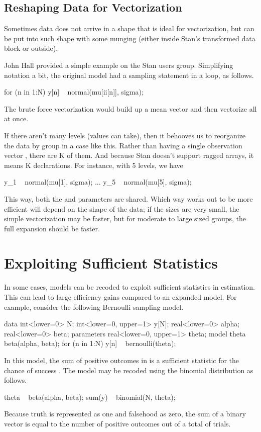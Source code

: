\subsection{Reshaping Data for Vectorization}

Sometimes data does not arrive in a shape that is ideal for
vectorization, but can be put into such shape with some munging
(either inside Stan's transformed data block or outside).

John Hall provided a simple example on the Stan users group.
Simplifying notation a bit, the original model had a sampling
statement in a loop, as follows.
%
\begin{stancode}
for (n in 1:N)
  y[n] ~ normal(mu[ii[n]], sigma);
\end{stancode}
%
The brute force vectorization would build up a mean vector and then
vectorize all at once.
%
\begin{stancode}
{
  vector[N] mu_ii;
  for (n in 1:N)
    mu_ii[n] = mu[ii[n]];
  y ~ normal(mu_ii, sigma);
\end{stancode}
%
If there aren't many levels (values  can take), then it
behooves us to reorganize the data by group in a case like this.
Rather than having a single observation vector , there are K of them.
And because Stan doesn't support ragged arrays, it means K
declarations.  For instance, with 5 levels, we have
%
\begin{stancode}
  y_1 ~ normal(mu[1], sigma);
  ...
  y_5 ~ normal(mu[5], sigma);
\end{stancode}
%
This way, both the  and  parameters are shared.
Which way works out to be more efficient will depend on the shape of
the data; if the sizes are very small, the simple vectorization may be
faster, but for moderate to large sized groups, the full expansion
should be faster.

\section{Exploiting Sufficient Statistics}

In some cases, models can be recoded to exploit sufficient statistics
in estimation.  This can lead to large efficiency gains compared to an
expanded model.  For example, consider the following Bernoulli
sampling model.
%
\begin{stancode}
data {
  int<lower=0> N;
  int<lower=0, upper=1> y[N];
  real<lower=0> alpha;
  real<lower=0> beta;
}
parameters {
  real<lower=0, upper=1> theta;
}
model {
  theta ~ beta(alpha, beta);
  for (n in 1:N)
    y[n] ~ bernoulli(theta);
}
\end{stancode}
%
In this model, the sum of positive outcomes in  is a
sufficient statistic for the chance of success .  The
model may be recoded using the binomial distribution as follows.
%
\begin{stancode}
    theta ~ beta(alpha, beta);
    sum(y) ~ binomial(N, theta);
\end{stancode}
%
Because truth is represented as one and falsehood as zero, the sum
 of a binary vector  is equal to the number of
positive outcomes out of a total of  trials.

